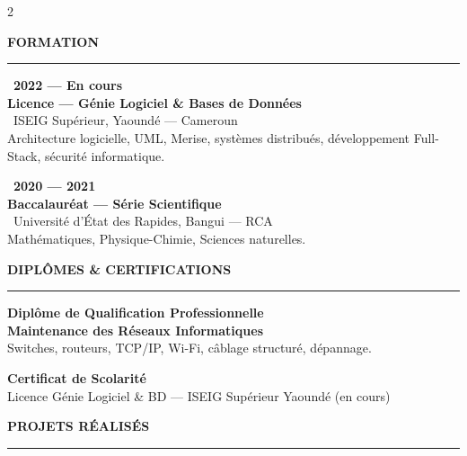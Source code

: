 \documentclass[a4paper,10pt]{article}
\newcommand{\rsection}[2]{%
  \vspace{2pt}%
  {\color{titlecolor}\small\bfseries#1\enspace#2}\\[-3pt]%
  {\color{accent}\rule{\linewidth}{1.2pt}}\par\vspace{3pt}%
}
\newcommand{\eduentry}[4]{%
  {\scriptsize\color{graytext}\faCalendar*\ \textbf{#1}}\\[0pt]%
  {\small\bfseries\color{titlecolor}#2}\\[0pt]%
  {\scriptsize\color{accent}\faUniversity\ #3}\\[0pt]%
  {\scriptsize\color{graytext}#4}\par\vspace{4pt}%
}
\begin{document}
\begin{paracol}{2}
\begin{tcolorbox}[enhanced, blanker, left=5mm, right=3.5mm, top=5mm, bottom=5mm]
\end{tcolorbox}

\switchcolumn

\begin{tcolorbox}[enhanced, blanker,
  colback=white, left=6mm, right=5mm, top=5mm, bottom=4mm]

\rsection{\faGraduationCap}{FORMATION}

\eduentry{2022 — En cours}
  {Licence — Génie Logiciel \& Bases de Données}
  {ISEIG Supérieur, Yaoundé — Cameroun}
  {Architecture logicielle, UML, Merise, systèmes distribués, développement Full-Stack, sécurité informatique.}

\eduentry{2020 — 2021}
  {Baccalauréat — Série Scientifique}
  {Université d'État des Rapides, Bangui — RCA}
  {Mathématiques, Physique-Chimie, Sciences naturelles.}

\rsection{\faCertificate}{DIPLÔMES \& CERTIFICATIONS}

\begin{tcolorbox}[enhanced, colback=accentlight, colframe=accent,
  boxrule=0.6pt, arc=3pt, left=5pt, right=5pt, top=3pt, bottom=3pt,
  before skip=0pt, after skip=3pt]
  {\small\bfseries\color{accent}\faMedal\quad Diplôme de Qualification Professionnelle}\\[1pt]
  {\scriptsize\color{titlecolor}\textbf{Maintenance des Réseaux Informatiques}}\\
  {\scriptsize\color{graytext}Switches, routeurs, TCP/IP, Wi-Fi, câblage structuré, dépannage.}
\end{tcolorbox}

\begin{tcolorbox}[enhanced, colback=lightbg, colframe=graytext!25,
  boxrule=0.6pt, arc=3pt, left=5pt, right=5pt, top=3pt, bottom=3pt,
  before skip=0pt, after skip=3pt]
  {\small\bfseries\color{titlecolor}\faFileAlt\quad Certificat de Scolarité}\\[1pt]
  {\scriptsize\color{graytext}Licence Génie Logiciel \& BD — ISEIG Supérieur Yaoundé (en cours)}
\end{tcolorbox}

\rsection{\faProjectDiagram}{PROJETS RÉALISÉS}


\end{tcolorbox}
\end{paracol}
\end{document}
